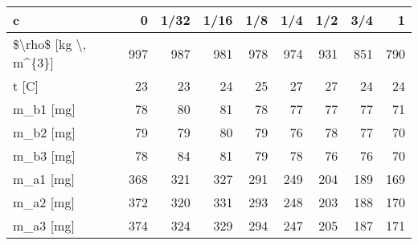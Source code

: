 \begin{tabular}{lrrrrrrrr}
\toprule
                   c &   0 &  1/32 &  1/16 &  1/8 &  1/4 &  1/2 &  3/4 &   1 \\
\midrule
\$\textbackslash rho\$ [kg \textbackslash , m\textasciicircum \{3\}] & 997 &   987 &   981 &  978 &  974 &  931 &  851 & 790 \\
               t [C] &  23 &    23 &    24 &   25 &   27 &   27 &   24 &  24 \\
           m\_b1 [mg] &  78 &    80 &    81 &   78 &   77 &   77 &   77 &  71 \\
           m\_b2 [mg] &  79 &    79 &    80 &   79 &   76 &   78 &   77 &  70 \\
           m\_b3 [mg] &  78 &    84 &    81 &   79 &   78 &   76 &   76 &  70 \\
           m\_a1 [mg] & 368 &   321 &   327 &  291 &  249 &  204 &  189 & 169 \\
           m\_a2 [mg] & 372 &   320 &   331 &  293 &  248 &  203 &  188 & 170 \\
           m\_a3 [mg] & 374 &   324 &   329 &  294 &  247 &  205 &  187 & 171 \\
\bottomrule
\end{tabular}
